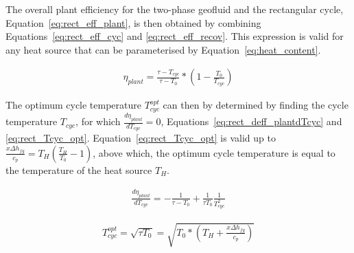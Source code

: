         The overall plant efficiency for the two-phase geofluid and the rectangular cycle, Equation~\ref{eq:rect_eff_plant}, is then obtained by combining Equations~\ref{eq:rect_eff_cyc} and \ref{eq:rect_eff_recov}. This expression is valid for any heat source that can be parameterised by Equation~\ref{eq:heat_content}.

        \begin{align}
            \eta_{plant} = \frac{\tau - T_{cyc}}{\tau - T_0} * \left(1-  \frac{T_0}{T_{cyc}}\right)\label{eq:rect_eff_plant}
        \end{align}
        

        The optimum cycle temperature \(T_{cyc}^{opt}\) can then by determined by finding the cycle temperature \(T_{cyc}\), for which \(\frac{d\eta_{plant}}{dT_{cyc}}=0\), Equations~\ref{eq:rect_deff_plantdTcyc} and \ref{eq:rect_Tcyc_opt}. Equation~\ref{eq:rect_Tcyc_opt} is valid up to \(\frac{x\Delta h_{fg}}{c_p} = T_H\left(\frac{T_H}{T_0}-1\right)\), above which, the optimum cycle temperature is equal to the temperature of the heat source \(T_H\).

        \begin{align}
            \frac{d\eta_{plant}}{dT_{cyc}} = -\frac{1}{\tau - T_0} + \frac{1}{\tau T_0} \frac{1}{T_{cyc}^2}\label{eq:rect_deff_plantdTcyc}
        \end{align}

        \begin{align}
            T_{cyc}^{opt} = \sqrt{\tau T_0}=\sqrt{T_0 * \left(T_H + \frac{x\Delta h_{fg}}{c_p}\right)} \label{eq:rect_Tcyc_opt}
        \end{align}

